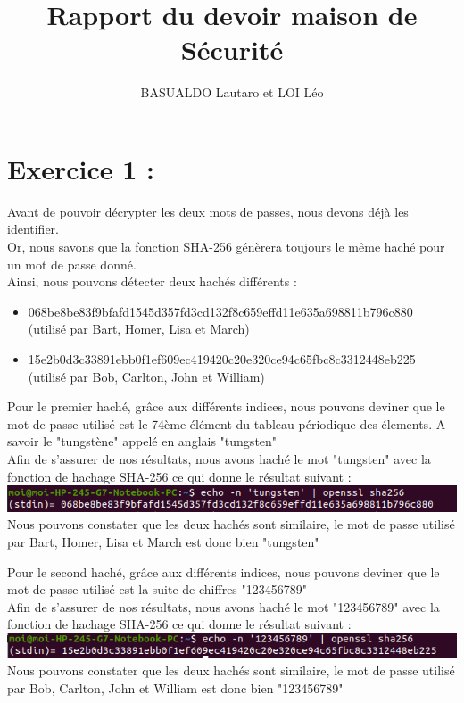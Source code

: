 \documentclass{article}
\title{Rapport du devoir maison de Sécurité}
\author{BASUALDO Lautaro et LOI Léo}
\begin{document}
\maketitle

\tableofcontents
\newpage

\section{Exercice 1 :}

    Avant de pouvoir décrypter les deux mots de passes, nous devons déjà les identifier.\\
    Or, nous savons que la fonction SHA-256 génèrera toujours le même haché pour un mot de passe donné.\\
    Ainsi, nous pouvons détecter deux hachés différents :
    \begin{itemize}
        \item 068be8be83f9bfafd1545d357fd3cd132f8c659effd11e635a698811b796c880\\
        (utilisé par Bart, Homer, Lisa et March)
        \item 15e2b0d3c33891ebb0f1ef609ec419420c20e320ce94c65fbc8c3312448eb225\\
        (utilisé par Bob, Carlton, John et William)
    \end{itemize}

    Pour le premier haché, grâce aux différents indices, nous pouvons deviner que le mot de passe utilisé est le 74ème élément du tableau périodique des élements. A savoir le "tungstène" appelé en anglais "tungsten"\\
    Afin de s'assurer de nos résultats, nous avons haché le mot "tungsten" avec la fonction de hachage SHA-256 ce qui donne le résultat suivant :\\
    \includegraphics[scale = 0.5]{tungsten.png}
    Nous pouvons constater que les deux hachés sont similaire, le mot de passe utilisé par Bart, Homer, Lisa et March est donc bien "tungsten"\medskip

    Pour le second haché, grâce aux différents indices, nous pouvons deviner que le mot de passe utilisé est la suite de chiffres "123456789"\\
    Afin de s'assurer de nos résultats, nous avons haché le mot "123456789" avec la fonction de hachage SHA-256 ce qui donne le résultat suivant :\\
    \includegraphics[scale = 0.5]{chiffre.png}
    Nous pouvons constater que les deux hachés sont similaire, le mot de passe utilisé par Bob, Carlton, John et William est donc bien "123456789"
\newpage
\end{document}

